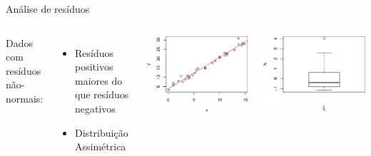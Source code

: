 \documentclass{beamer}\usepackage[]{graphicx}\usepackage[]{color}
\newenvironment{knitrout}{}{} %
\renewenvironment{knitrout}{\setlength{\topsep}{0mm}}{}
\begin{document}
\begin{frame}{Análise de resíduos}

\begin{columns}[c]

\small

Dados com resíduos não-normais: 
\begin{itemize}
\item Resíduos positivos maiores do que resíduos negativos 
\item Distribuição Assimétrica 
\end{itemize}


\begin{knitrout}
\color{fgcolor}
\includegraphics[width=1\linewidth]{figure/r4-1} 

\includegraphics[width=1\linewidth]{figure/r4-2} 

\end{knitrout}
\end{columns}

\end{frame}
\end{document}
